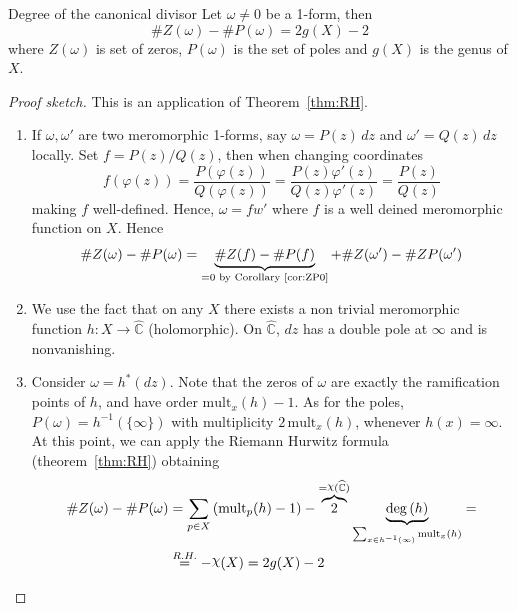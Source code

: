 \begin{theorem}{Degree of the canonical divisor}
    Let \(\omega \neq 0\) be a 1-form, then
    \[
      \# Z{(\omega)} - \#P{(\omega)} = 2g{(X)} - 2
    \]
    where \(Z{(\omega)}\) is set of zeros, \(P{(\omega)}\) is the set of poles
    and \(g{(X)}\) is the genus of \(X\).
\end{theorem}
\begin{proof}[Proof sketch]
    This is an application of Theorem~\ref{thm:RH}.
\begin{enumerate}[label = \arabic*.]
    \item If \(\omega, \omega'\) are two meromorphic 1-forms, say \(\omega =
        P{(z)}\,dz\) and \(\omega' = Q{(z)}\,dz\) locally. Set \(f =
        P{(z)}/Q{(z)}\), then when changing coordinates
        \[
          f{(\varphi {(z)})} = \frac{P{(\varphi {(z)})}}{Q{(\varphi {(z)})}} =
          \frac{P{(z)}\varphi '{(z)}}{Q{(z)}\varphi '{(z)}} =
          \frac{P{(z)}}{Q{(z)}}
        \]
        making \(f\) well-defined. Hence, \(\omega = fw'\) where \(f\) is a well
        deined meromorphic function on \(X\). Hence
        \[
            \# Z{(\omega)} - \# P{(\omega)} = \underbrace{\#Z{(f)} - \#
            P{(f)}}_{=0 \text{ by Corollary~\ref{cor:ZP0}}}  + \#
          Z{(\omega')} - \# Z P{(\omega')}
        \]
    \item We use the fact that on any \(X\) there exists a non trivial
        meromorphic function \(h : X \to \widehat{\mathbb{C}}\) (holomorphic).
        On \(\widehat{\mathbb{C}}\), \(dz\) has a double pole at \(\infty\) and
        is nonvanishing.
    \item Consider \(\omega = h^{*}{(dz)}\). Note that the zeros of \(\omega\)
        are exactly the ramification points of \(h\), and have order
        \(\mathrm{mult}_x{(h)} - 1\). As for the poles, \(P{(\omega)} =
        h^{-1}{(\{\infty\} )}\) with multiplicity \(2\,\mathrm{mult}_x{(h)}\),
        whenever \(h{(x)} = \infty\). At this point, we can apply the Riemann
        Hurwitz formula (theorem~\ref{thm:RH}) obtaining
        \begin{align*}
            \# Z{(\omega)} - \# P {(\omega)} &= \sum_{p \in X} {\left(
          \mathrm{mult}_p {(h)} - 1 \right)} -
          \overbrace{2}^{=\rchi{(\widehat{\mathbb{C}})}}  \underbrace{\deg
          {(h)}}_{\sum_{x \in h^{-1}{(\infty)}} \mathrm{mult}_x{(h)} } =\\
                                             &\overset{R.H.}{=} - \rchi{(X)} = 2g{(X)} - 2
        \end{align*}
\end{enumerate}
\end{proof}



